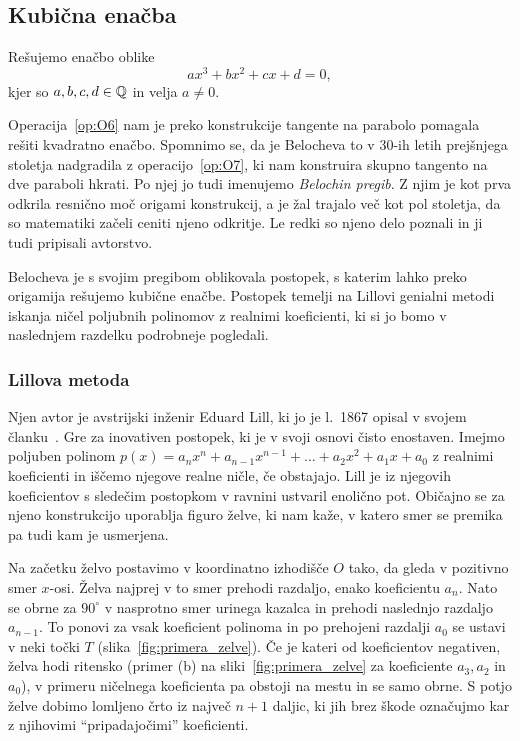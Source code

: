 \subsection{Kubična enačba}

Rešujemo enačbo oblike
$$ a x^3 + b x^2 + c x + d = 0, $$
kjer so $a, b, c, d \in \mathbb Q$ in velja $a \neq 0$.

Operacija~\ref{op:O6} nam je preko konstrukcije tangente na parabolo pomagala rešiti kvadratno enačbo. Spomnimo se, da je Belocheva to v 30-ih letih prejšnjega stoletja nadgradila z operacijo~\ref{op:O7}, ki nam konstruira skupno tangento na dve paraboli hkrati. Po njej jo tudi imenujemo \emph{Belochin pregib}. Z njim je kot prva odkrila resnično moč origami konstrukcij, a je žal trajalo več kot pol stoletja, da so matematiki začeli ceniti njeno odkritje. Le redki so njeno delo poznali in ji tudi pripisali avtorstvo.

Belocheva je s svojim pregibom oblikovala postopek, s katerim lahko preko origamija rešujemo kubične enačbe. Postopek temelji na Lillovi genialni metodi iskanja ničel poljubnih polinomov z realnimi koeficienti, ki si jo bomo v naslednjem razdelku podrobneje pogledali.

\subsubsection{Lillova metoda}

Njen avtor je avstrijski inženir Eduard Lill, ki jo je l.\ 1867 opisal v svojem članku~\cite{lill1867}. Gre za inovativen postopek, ki je v svoji osnovi čisto enostaven. Imejmo poljuben polinom $ p(x) = a_n x^n + a_{n-1} x^{n-1} + \ldots + a_2 x^2 + a_1 x + a_0 $ z realnimi koeficienti in iščemo njegove realne ničle, če obstajajo. Lill je iz njegovih koeficientov s sledečim postopkom v ravnini ustvaril enolično pot. Običajno se za njeno konstrukcijo uporablja figuro želve, ki nam kaže, v katero smer se premika pa tudi kam je usmerjena.

Na začetku želvo postavimo v koordinatno izhodišče $O$ tako, da gleda v pozitivno smer $x$-osi. Želva najprej v to smer prehodi razdaljo, enako koeficientu $a_n$. Nato se obrne za $90^\circ$ v nasprotno smer urinega kazalca in prehodi naslednjo razdaljo $a_{n-1}$. To ponovi za vsak koeficient polinoma in po prehojeni razdalji $a_0$ se ustavi v neki točki $T$ (slika~\ref{fig:primera_zelve}). Če je kateri od koeficientov negativen, želva hodi ritensko (primer (b) na sliki~\ref{fig:primera_zelve} za koeficiente $a_3, a_2$ in $a_0$), v primeru ničelnega koeficienta pa obstoji na mestu in se samo obrne. S potjo želve dobimo lomljeno črto iz največ $n+1$ daljic, ki jih brez škode označujmo kar z njihovimi ``pripadajočimi'' koeficienti.

